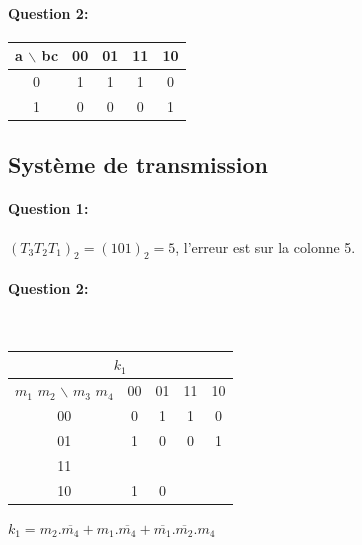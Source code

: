 \paragraph{Question 2:}

\begin{center}
\begin{tabular}{|c|c|c|c|c|}
\hline
a $\backslash$ bc & 00 & 01 & 11 & 10 \\
\hline
0  & 1 & 1 & 1 & 0 \\
\hline
1  & 0 & 0 & 0 & 1 \\
\hline
\end{tabular} 
\end{center}

\subsection{Système de transmission}

\paragraph{Question 1:} $(T_3T_2T_1)_2=(101)_2=5$, l'erreur est sur la colonne 5.

\paragraph{Question 2:} ~\

\begin{minipage}{0.45\linewidth}
\begin{center}
\begin{tabular}{|c|c|c|c|c|}
\hline
\multicolumn{5}{|c|}{$k_1$} \\
\hline
$m_1$ $m_2$ $\backslash$ $m_3$ $m_4$ & 00 & 01 & 11 & 10 \\
\hline
00  & 0 & \cellcolor{bleuf} 1 & \cellcolor{bleuf} 1 & 0 \\
\hline
01  & \cellcolor{bleuf}1 & 0 & 0 &  \cellcolor{bleuf} 1 \\
\hline
11  & \cellcolor{bleuf} &  &  & \cellcolor{bleuf} \\
\hline
10  & \cellcolor{bleuf} 1 & 0 &  & \cellcolor{bleuf} \\
\hline
\end{tabular} 
\end{center}
\end{minipage}\hfill
\begin{minipage}{0.45\linewidth}
$k_1=m_2.\overline{m_4}+m_1.\overline{m_4}+\overline{m_1}.\overline{m_2}.m_4$
\end{minipage}

